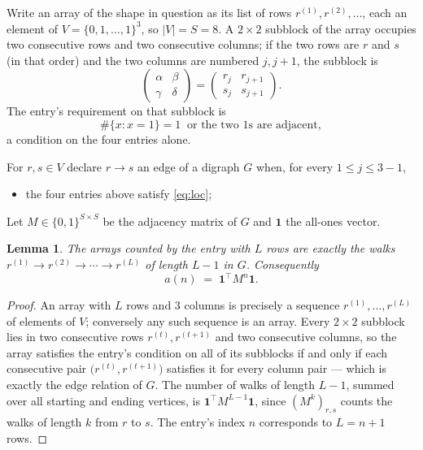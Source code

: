 \documentclass[11pt,a4paper]{article}
\theoremstyle{plain}
\newtheorem{lemma}[theorem]{Lemma}
\theoremstyle{definition}
\begin{document}
Write an array of the shape in question as its list of rows
$r^{(1)},r^{(2)},\dots$, each an element of
$V=\{0,1,\dots,1\}^{3}$, so $|V|=S=8$. A $2\times2$ subblock of the array
occupies two consecutive rows and two consecutive columns; if the two rows are $r$
and $s$ (in that order) and the two columns are numbered $j,j+1$,
the subblock is
\[
\begin{pmatrix}\alpha&\beta\\\gamma&\delta\end{pmatrix}=\begin{pmatrix}r_j&r_{j+1}\\s_j&s_{j+1}\end{pmatrix}.
\]
The entry's requirement on that subblock is
\begin{equation}\label{eq:loc}
\#\{x:x=1\}=1\ \text{ or the two }1\text{s are adjacent},
\end{equation}
a condition on the four entries alone.

For $r,s\in V$ declare $r\to s$ an edge of a digraph $G$ when, for every
$1\le j\le 3-1$,
\begin{itemize}
\item the four entries above satisfy \eqref{eq:loc};

\end{itemize}
Let $M\in\{0,1\}^{S\times S}$ be the adjacency matrix of $G$ and $\mathbf{1}$ the
all-ones vector.

\begin{lemma}\label{lem:walk}
The arrays counted by the entry with $L$ rows are exactly the walks
$r^{(1)}\to r^{(2)}\to\cdots\to r^{(L)}$ of length $L-1$ in $G$. Consequently
\[
a(n)\;=\;\mathbf{1}^{\!\top}M^{n}\mathbf{1} .
\]
\end{lemma}

\begin{proof}
An array with $L$ rows and $3$ columns is precisely a sequence
$r^{(1)},\dots,r^{(L)}$ of elements of $V$; conversely any such sequence is an array.
Every $2\times2$ subblock lies in two consecutive rows $r^{(t)},r^{(t+1)}$ and two
consecutive columns, so the array satisfies the entry's condition on all of its subblocks
if and only if each consecutive pair $\bigl(r^{(t)},r^{(t+1)}\bigr)$ satisfies it for
every column pair --- which is exactly the edge relation of $G$. The number of walks of
length $L-1$, summed over all starting and ending vertices, is
$\mathbf{1}^{\!\top}M^{L-1}\mathbf{1}$, since $(M^{k})_{r,s}$ counts the walks of
length $k$ from $r$ to $s$. The entry's index $n$ corresponds to $L=n+1$ rows.
\end{proof}
\end{document}
